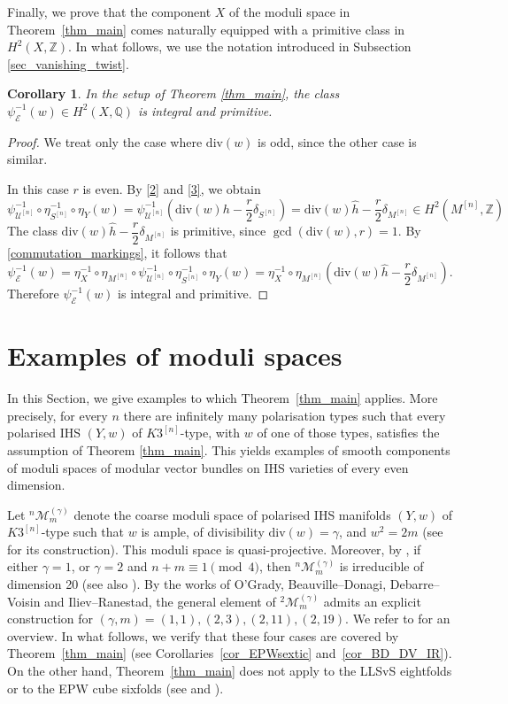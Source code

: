 \documentclass[12pt,a4paper]{amsart}
\theoremstyle{plain}
\newtheorem{cor}[thm]{Corollary}
\theoremstyle{definition}
\theoremstyle{remark}
\def\Z{\mathbb{Z}}
\def\QQ{\mathbb{Q}}
\def\U{\mathcal{U}}
\newcommand{\kE}{\mathcal{E}}
\newcommand{\dv}{\mathrm{div}}
\newcommand{\rathodge}[1]{\psi_{#1}}
\begin{document}
Finally, we prove that the component  $X$ of the moduli space in Theorem~\ref{thm_main} comes naturally equipped with a primitive class in $H^2(X,\Z)$.
In what follows, we use the notation introduced in Subsection \ref{sec_vanishing_twist}.
\begin{cor}\label{integral_primitive}
In the setup of Theorem \ref{thm_main}, the class $\rathodge{\kE}^{-1}(w)\in H^2(X,\QQ)$ is integral and primitive.
\end{cor}
\begin{proof}
We treat only the case where $\dv(w)$ is odd, since the other case is similar.

In this case $r$ is even. By \ref{2} and \ref{3}, we obtain
\[
    \rathodge{\U^{[n]}}^{-1}\circ\eta_{S^{[n]}}^{-1}\circ\eta_Y(w)=\rathodge{\U^{[n]}}^{-1}\left(\dv(w)h-\dfrac{r}{2}\delta_{S^{[n]}}\right)=\dv(w)\widehat{h}-\dfrac{r}{2}\delta_{M^{[n]}}\in H^2(M^{[n]},\Z)
\]
The class $\dv(w)\widehat{h}-\dfrac{r}{2}\delta_{M^{[n]}}$ is primitive, since $\gcd(\dv(w),r)=1$. By \eqref{commutation_markings}, it follows that
\[
    \rathodge{\kE}^{-1}(w)=\eta_X^{-1}\circ\eta_{M^{[n]}}\circ\rathodge{\U^{[n]}}^{-1}\circ\eta_{S^{[n]}}^{-1}\circ\eta_Y(w)=\eta_X^{-1}\circ\eta_{M^{[n]}}\left(\dv(w)\widehat{h}-\dfrac{r}{2}\delta_{M^{[n]}}\right).
\]
Therefore $\rathodge{\kE}^{-1}(w)$ is integral and primitive.
\end{proof}


\section{Examples of moduli spaces}\label{sec_examples}
In this Section, we give examples to which Theorem~\ref{thm_main} applies. More precisely, for every $n$ there are infinitely many polarisation types such that every polarised IHS $(Y,w)$ of $K3^{[n]}$-type, with $w$ of one of those types, satisfies the assumption of Theorem \ref{thm_main}. This yields examples of smooth components of moduli spaces of modular vector bundles on IHS varieties of every even dimension.

Let $^{n}\mathcal{M}_m^{(\gamma)}$ denote the coarse moduli space of polarised IHS manifolds $(Y,w)$ of $K3^{[n]}$-type such that $w$ is ample, of divisibility $\dv(w)=\gamma$, and $w^2=2m$ (see \cite[Theorem 1.5]{GHS_moduli_IHS} for its construction). This moduli space is quasi-projective. Moreover, by \cite{apost_moduli_red}, if either $\gamma=1$, or $\gamma=2$ and $n+m\equiv 1\pmod{4}$, then $^{n}\mathcal{M}_m^{(\gamma)}$ is irreducible of dimension 20 (see also \cite[Theorem 3.5]{olivier_HK}). By the works of O'Grady, Beauville--Donagi, Debarre--Voisin and Iliev--Ranestad, the general element of $^{2}\mathcal{M}_m^{(\gamma)}$ admits an explicit construction for $(\gamma,m)=(1,1), (2,3), (2,11), (2,19)$. We refer to \cite[§3.6.1]{olivier_HK} for an overview. In what follows, we verify that these four cases are covered by Theorem~\ref{thm_main} (see Corollaries~\ref{cor_EPWsextic} and~\ref{cor_BD_DV_IR}). On the other hand, Theorem~\ref{thm_main} does not apply to the LLSvS eightfolds or to the EPW cube sixfolds (see \cite{LLSvS} and \cite{EPWcubes}).
\end{document}
